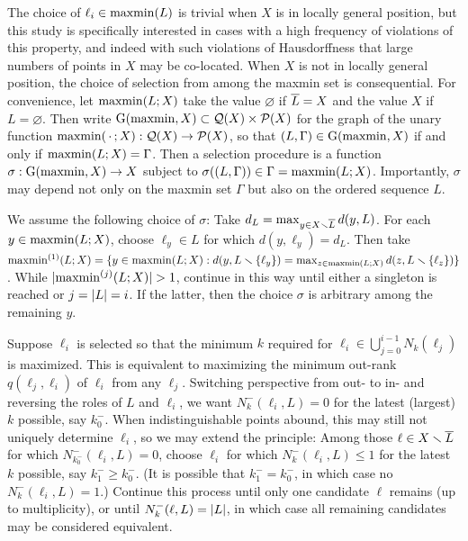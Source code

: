\documentclass{article}
\begin{document}
The choice of \(\ell_i \in \operatorname{maxmin}(L)\) is trivial when \(X\) is in
locally general position, but this study is specifically interested in
cases with a high frequency of violations of this property, and indeed
with such violations of Hausdorffness that large numbers of points in
\(X\) may be co-located. When \(X\) is not in locally general position,
the choice of selection from among the maxmin set is consequential. For
convenience, let \(\operatorname{maxmin}(L;X)\) take the value \(\varnothing\) if
\(\overline{L}=X\) and the value \(X\) if \(L=\varnothing\). Then write
\(\operatorname{G}(\operatorname{maxmin}, X) \subset \mathcal{Q}(X) \times \mathcal{P}(X)\) for the graph
of the unary function \(\operatorname{maxmin}(\,\cdot\,;X): \mathcal{Q}(X) \to \mathcal{P}(X)\),
so that \((L,\Gamma) \in \operatorname{G}(\operatorname{maxmin}, X)\) if and only if
\(\operatorname{maxmin}(L;X) = \Gamma\). Then a selection procedure is a function
\(\sigma: \operatorname{G}(\operatorname{maxmin}, X) \to X\) subject to
\(\sigma((L,\Gamma)) \in \Gamma = \operatorname{maxmin}(L;X)\). Importantly,
\(\sigma\) may depend not only on the maxmin set \(\Gamma\) but also on
the ordered sequence \(L\).

We assume the following choice of \(\sigma\): Take
\(d_L = \max_{y \in X \smallsetminus \overline{L}}{d(y,L)}\). For each
\(y \in \operatorname{maxmin}(L;X)\), choose \(\ell_y \in L\) for which
\(d(y,\ell_y) = d_L\). Then take
\(\operatorname{maxmin}^{(1)}(L;X) = \{y \in \operatorname{maxmin}(L;X) : d(y,L \smallsetminus \{\ell_y\}) = \max_{z \in \operatorname{maxmin}(L;X)}{d(z,L \smallsetminus \{\ell_z\})}\}\).
While \(\lvert \operatorname{maxmin}^{(j)}(L;X)\rvert > 1\), continue in this way until
either a singleton is reached or \(j=\lvert L\rvert=i\). If the latter, then
the choice \(\sigma\) is arbitrary among the remaining \(y\).

Suppose \(\ell_i\) is selected so that the minimum \(k\) required for
\(\ell_i \in \bigcup_{j=0}^{i-1}{N_k(\ell_j)}\) is maximized. This is
equivalent to maximizing the minimum out-rank \(q(\ell_j,\ell_i)\) of
\(\ell_i\) from any \(\ell_j\). Switching perspective from out- to in-
and reversing the roles of \(L\) and \(\ell_i\), we want
\(N^-_k(\ell_i,L)=0\) for the latest (largest) \(k\) possible, say
\(k^-_0\). When indistinguishable points abound, this may still not
uniquely determine \(\ell_i\), so we may extend the principle: Among
those \(\ell\in X\smallsetminus \overline{L}\) for which \(N^-_{k^-_0}(\ell_i,L)=0\),
choose \(\ell_i\) for which \(N^-_{k}(\ell_i,L) \leq 1\) for the latest
\(k\) possible, say \(k^-_1 \geq k^-_0\). (It is possible that
\(k^-_1 = k^-_0\), in which case no \(N^-_k(\ell_i,L) = 1\).) Continue
this process until only one candidate \(\ell\) remains (up to
multiplicity), or until \(N^-_{k}(\ell,L)=\lvert L\rvert\), in which case all
remaining candidates may be considered equivalent.
\end{document}
